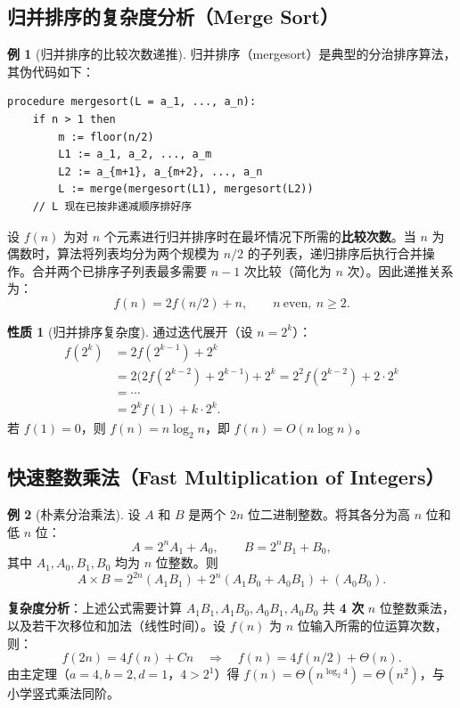 \documentclass[UTF8,11pt,a4paper]{ctexbook}   %
\theoremstyle{definition}
\newtheorem{example}{例}[section]
\newtheorem{property}{性质}[section]
\begin{document}
\subsection{归并排序的复杂度分析（Merge Sort）}

\begin{example}[归并排序的比较次数递推]
归并排序（mergesort）是典型的分治排序算法，其伪代码如下：

\begin{verbatim}
procedure mergesort(L = a_1, ..., a_n):
    if n > 1 then
        m := floor(n/2)
        L1 := a_1, a_2, ..., a_m
        L2 := a_{m+1}, a_{m+2}, ..., a_n
        L := merge(mergesort(L1), mergesort(L2))
    // L 现在已按非递减顺序排好序
\end{verbatim}

设 $f(n)$ 为对 $n$ 个元素进行归并排序时在最坏情况下所需的\textbf{比较次数}。当 $n$ 为偶数时，算法将列表均分为两个规模为 $n/2$ 的子列表，递归排序后执行合并操作。合并两个已排序子列表最多需要 $n-1$ 次比较（简化为 $n$ 次）。因此递推关系为：
\[
f(n) = 2f(n/2) + n,\qquad n\ \text{even},\ n\ge 2.
\]
\end{example}

\begin{property}[归并排序复杂度]
通过迭代展开（设 $n=2^k$）：
\begin{align*}
f(2^k) &= 2f(2^{k-1}) + 2^k\\
&= 2\bigl(2f(2^{k-2}) + 2^{k-1}\bigr) + 2^k = 2^2 f(2^{k-2}) + 2\cdot 2^k\\
&= \cdots\\
&= 2^k f(1) + k\cdot 2^k.
\end{align*}
若 $f(1)=0$，则 $f(n) = n\log_2 n$，即 $f(n) = O(n\log n)$。
\end{property}

\subsection{快速整数乘法（Fast Multiplication of Integers）}

\begin{example}[朴素分治乘法]
设 $A$ 和 $B$ 是两个 $2n$ 位二进制整数。将其各分为高 $n$ 位和低 $n$ 位：
\[
A = 2^n A_1 + A_0,\qquad B = 2^n B_1 + B_0,
\]
其中 $A_1,A_0,B_1,B_0$ 均为 $n$ 位整数。则
\[
A\times B = 2^{2n}(A_1 B_1) + 2^n(A_1 B_0 + A_0 B_1) + (A_0 B_0).
\]

\textbf{复杂度分析}：上述公式需要计算 $A_1B_1, A_1B_0, A_0B_1, A_0B_0$ 共 \textbf{4 次} $n$ 位整数乘法，以及若干次移位和加法（线性时间）。设 $f(n)$ 为 $n$ 位输入所需的位运算次数，则：
\[
f(2n) = 4f(n) + Cn \quad\Longrightarrow\quad f(n) = 4f(n/2) + \Theta(n).
\]
由主定理（$a=4,b=2,d=1$，$4>2^1$）得 $f(n) = \Theta(n^{\log_2 4}) = \Theta(n^2)$，与小学竖式乘法同阶。
\end{example}
\end{document}
